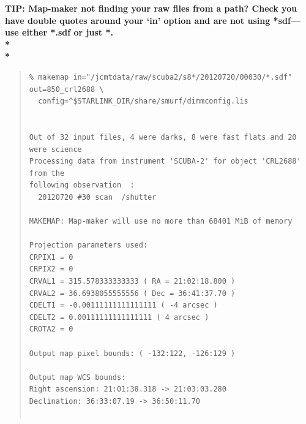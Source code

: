 \documentclass[twoside,11pt]{article}
\renewcommand{\_}{\texttt{\symbol{95}}}
\newenvironment{myquote}{
   \color{MidnightBlue}\begin{quote}\begin{small}}{
   \end{small}\end{quote}
}
\renewenvironment{myquote}{
      \begin{quote}\begin{small}}{
      \end{small}\end{quote}
   }
\begin{document}
\begin{htmlonly}
\textbf{TIP: Map-maker not finding your raw files from a path? Check
you have double quotes around your `in' option and are not using
*sdf---use either *.sdf or just *.\\*\\*}
\end{htmlonly}


\begin{myquote}
\begin{verbatim}
% makemap in="/jcmtdata/raw/scuba2/s8*/20120720/00030/*.sdf" out=850_crl2688 \
  config=^$STARLINK_DIR/share/smurf/dimmconfig.lis


Out of 32 input files, 4 were darks, 8 were fast flats and 20 were science
Processing data from instrument 'SCUBA-2' for object 'CRL2688' from the
following observation  :
  20120720 #30 scan  /shutter

MAKEMAP: Map-maker will use no more than 68401 MiB of memory

Projection parameters used:
CRPIX1 = 0
CRPIX2 = 0
CRVAL1 = 315.578333333333 ( RA = 21:02:18.800 )
CRVAL2 = 36.6938055555556 ( Dec = 36:41:37.70 )
CDELT1 = -0.00111111111111111 ( -4 arcsec )
CDELT2 = 0.00111111111111111 ( 4 arcsec )
CROTA2 = 0

Output map pixel bounds: ( -132:122, -126:129 )

Output map WCS bounds:
Right ascension: 21:01:38.318 -> 21:03:03.280
Declination: 36:33:07.19 -> 36:50:11.70


\end{verbatim}
\end{myquote}
\end{document}

